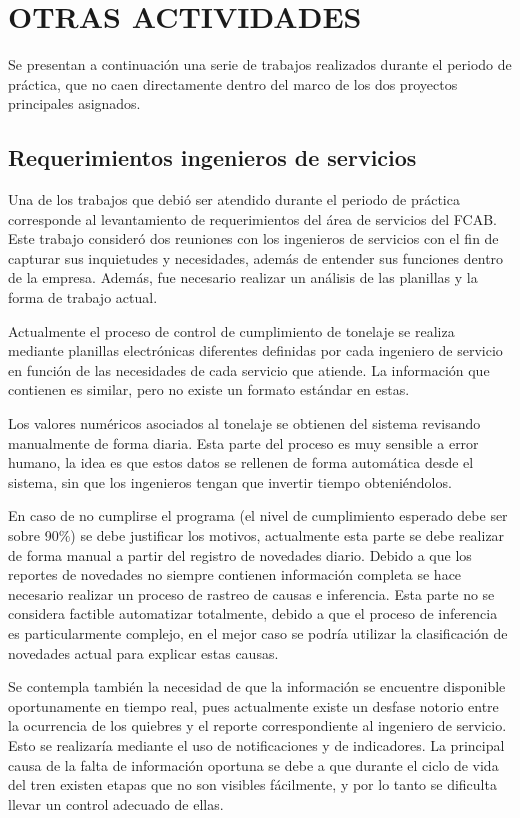 \documentclass[oneside,12pt, letterpaper, titlepage]{book}
\begin{document}
\chapter[Otras Actividades]{OTRAS ACTIVIDADES}
Se presentan a continuación una serie de trabajos realizados durante el periodo de práctica, que no caen directamente dentro del marco de los dos proyectos principales asignados.

\section{Requerimientos ingenieros de servicios}
Una de los trabajos que debió ser atendido durante el periodo de práctica corresponde al levantamiento de requerimientos del área de servicios del FCAB. Este trabajo consideró dos reuniones con los ingenieros de servicios con el fin de capturar sus inquietudes y necesidades, además de entender sus funciones dentro de la empresa. Además, fue necesario realizar un análisis de las planillas y la forma de trabajo actual.

Actualmente el proceso de control de cumplimiento de tonelaje se realiza mediante planillas electrónicas diferentes definidas por cada ingeniero de servicio en función de las necesidades de cada servicio que atiende. La información que contienen es similar, pero no existe un formato estándar en estas.

Los valores numéricos asociados al tonelaje se obtienen del sistema revisando manualmente de forma diaria. Esta parte del proceso es muy sensible a error humano, la idea es que estos datos se rellenen de forma automática desde el sistema, sin que los ingenieros tengan que invertir tiempo obteniéndolos.

En caso de no cumplirse el programa (el nivel de cumplimiento esperado debe ser sobre 90\%) se debe justificar los motivos, actualmente esta parte se debe realizar de forma manual a partir del registro de novedades diario. Debido a que los reportes de novedades no siempre contienen información completa se hace necesario realizar un proceso de rastreo de causas e inferencia. Esta parte no se considera factible automatizar totalmente, debido a que el proceso de inferencia es particularmente complejo, en el mejor caso se podría utilizar la clasificación de novedades actual para explicar estas causas.

Se contempla también la necesidad de que la información se encuentre disponible oportunamente en tiempo real, pues actualmente existe un desfase notorio entre la ocurrencia de los quiebres y el reporte correspondiente al ingeniero de servicio. Esto se realizaría mediante el uso de notificaciones y de indicadores. La principal causa de la falta de información oportuna se debe a que durante el ciclo de vida del tren existen etapas que no son visibles fácilmente, y por lo tanto se dificulta llevar un control adecuado de ellas.
\end{document}
